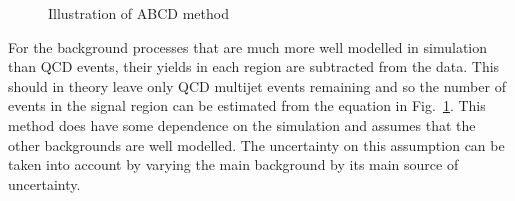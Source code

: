 \begin{figure}[ht!]
\begin{center}
\hspace{0.2cm}
\end{center}
\caption{Illustration of ABCD method}
\label{fig:ABCDdiagram}
\end{figure}

For the background processes that are much more well modelled in simulation than QCD events, their yields in each region are subtracted from the data. This should in theory leave only QCD multijet events remaining and so the number of events in the signal region can be estimated from the equation in Fig.~\ref{fig:ABCDdiagram}. This method does have some dependence on the simulation and assumes that the other backgrounds are well modelled. The uncertainty on this assumption can be taken into account by varying the main \ttbar background by its main source of uncertainty. 


